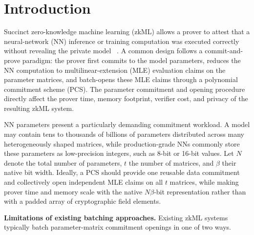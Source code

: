 
\section{Introduction}
\label{sec:intro}

Succinct zero-knowledge machine learning (zkML) allows a prover to attest that
a neural-network (NN) inference or training computation was executed correctly
without revealing the private model
~\cite{ccs/Balbas0VRS23,%
asiacrypt/CongCYY25,%
nips/GhodsiGG17,%
iacr/GuoGQZ25,%
esorics/KeufferMC18,%
uss/WengYXKW21,%
ccs/LiuXZ21,%
iacr/FengQZDC21,%
corr/KangHSS22,%
ccs/GargGJMMPW23,%
tifs/WengWTYL23,%
tdsc/LeeKKO24,%
ccs/SunLZ24,%
ccs/AbbaszadehPK024,%
popets/WangH23,%
icml/WaiwitlikhitS0H24,%
sp/QuGYZ26,%
ccs/RiasiWBVH25,%
uss/GuoLHQTZ25,%
uss/0001SLLGCZ25}.
A common design follows a commit-and-prove paradigm:
the prover first commits to the model parameters, reduces the
NN computation to multilinear-extension (MLE) evaluation claims on the parameter
matrices, and batch-opens these MLE claims through a polynomial commitment scheme
(PCS).
The parameter commitment and opening procedure directly affect the prover time, memory
footprint, verifier cost, and privacy of the resulting zkML system.

NN parameters present a particularly demanding commitment workload.
A model may contain tens to thousands of billions of parameters distributed across many
heterogeneously shaped matrices, while production-grade NNs commonly store
these parameters as low-precision integers, such as 8-bit or 16-bit values.
Let \(N\) denote the total number of parameters, \(t\) the number of matrices,
and \(\beta\) their native bit width.
Ideally, a PCS should provide one reusable data commitment and collectively open independent MLE claims on all \(t\) matrices, while making prover time and memory scale with the native
\(N\beta\)-bit representation rather than with a padded array of cryptographic
field elements.

\mysmallskip
\noindent\textbf{Limitations of existing batching approaches.}
Existing zkML systems typically batch parameter-matrix commitment openings in one of two
ways.

